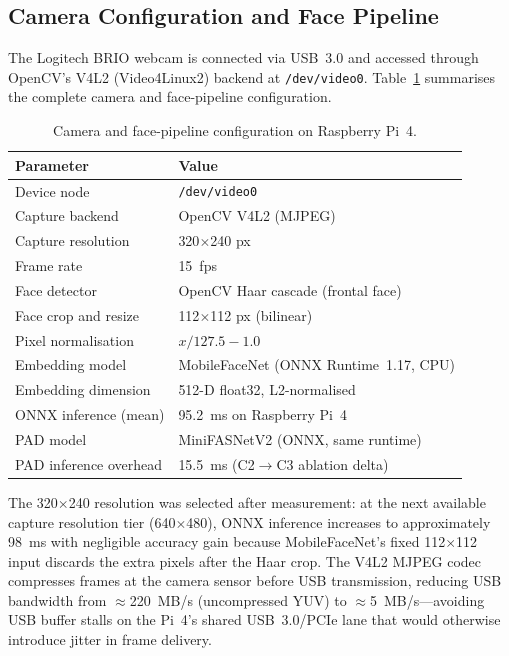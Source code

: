 \documentclass[pdflatex,sn-vancouver-num]{sn-jnl}%
\theoremstyle{thmstyleone}%
\theoremstyle{thmstyletwo}%
\theoremstyle{thmstylethree}%
\begin{document}
\subsection{Camera Configuration and Face Pipeline}

The Logitech BRIO webcam is connected via USB~3.0 and accessed through
OpenCV's V4L2 (Video4Linux2) backend at \texttt{/dev/video0}.
Table~\ref{tab:camera_config} summarises the complete camera and
face-pipeline configuration.

\begin{table}[t]
\caption{Camera and face-pipeline configuration on Raspberry Pi~4.}
\label{tab:camera_config}%
\begin{tabular}{|l|l|}
  \hline
  Parameter & Value \\
  \hline
  Device node             & \texttt{/dev/video0} \\
  Capture backend         & OpenCV V4L2 (MJPEG) \\
  Capture resolution      & 320$\times$240 px \\
  Frame rate              & 15~fps \\
  Face detector           & OpenCV Haar cascade (frontal face) \\
  Face crop and resize    & 112$\times$112 px (bilinear) \\
  Pixel normalisation     & $x/127.5 - 1.0$ \\
  Embedding model         & MobileFaceNet (ONNX Runtime~1.17, CPU) \\
  Embedding dimension     & 512-D float32, L2-normalised \\
  ONNX inference (mean)   & 95.2~ms on Raspberry Pi~4 \\
  PAD model               & MiniFASNetV2 (ONNX, same runtime) \\
  PAD inference overhead  & 15.5~ms (C2$\to$C3 ablation delta) \\
  \hline
\end{tabular}
\end{table}

The 320$\times$240 resolution was selected after measurement: at the next
available capture resolution tier (640$\times$480), ONNX inference increases to approximately
98~ms with negligible accuracy gain because MobileFaceNet's fixed
112$\times$112 input discards the extra pixels after the Haar crop. The V4L2
MJPEG codec compresses frames at the camera sensor before USB transmission,
reducing USB bandwidth from $\approx$220~MB/s (uncompressed YUV) to
$\approx$5~MB/s---avoiding USB buffer stalls on the Pi~4's shared USB~3.0/PCIe
lane that would otherwise introduce jitter in frame delivery.
\end{document}
